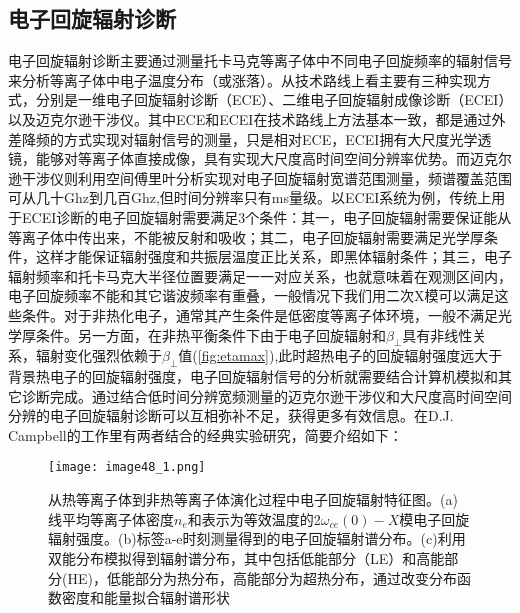 \subsection{	电子回旋辐射诊断}
电子回旋辐射诊断主要通过测量托卡马克等离子体中不同电子回旋频率的辐射信号来分析等离子体中电子温度分布（或涨落）。从技术路线上看主要有三种实现方式，分别是一维电子回旋辐射诊断（ECE）、二维电子回旋辐射成像诊断（ECEI）以及迈克尔逊干涉仪。其中ECE和ECEI在技术路线上方法基本一致，都是通过外差降频的方式实现对辐射信号的测量，只是相对ECE，ECEI拥有大尺度光学透镜，能够对等离子体直接成像，具有实现大尺度高时间空间分辨率优势。而迈克尔逊干涉仪则利用空间傅里叶分析实现对电子回旋辐射宽谱范围测量，频谱覆盖范围可从几十Ghz到几百Ghz,但时间分辨率只有ms量级\cite{RN743}。以ECEI系统为例，传统上用于ECEI诊断的电子回旋辐射需要满足3个条件：其一，电子回旋辐射需要保证能从等离子体中传出来，不能被反射和吸收；其二，电子回旋辐射需要满足光学厚条件，这样才能保证辐射强度和共振层温度正比关系，即黑体辐射条件；其三，电子辐射频率和托卡马克大半径位置要满足一一对应关系，也就意味着在观测区间内，电子回旋频率不能和其它谐波频率有重叠，一般情况下我们用二次X模可以满足这些条件。对于非热化电子，通常其产生条件是低密度等离子体环境，一般不满足光学厚条件。另一方面，在非热平衡条件下由于电子回旋辐射和$β_⊥$具有非线性关系，辐射变化强烈依赖于$β_⊥$值(\autoref{fig:etamax}),此时超热电子的回旋辐射强度远大于背景热电子的回旋辐射强度，电子回旋辐射信号的分析就需要结合计算机模拟和其它诊断完成。通过结合低时间分辨宽频测量的迈克尔逊干涉仪和大尺度高时间空间分辨的电子回旋辐射诊断可以互相弥补不足，获得更多有效信息。在D.J. Campbell\cite{RN726}的工作里有两者结合的经典实验研究，简要介绍如下：
\begin{figure}[ht]
\centering
\texttt{[image: image48\_1.png]}
\caption{\label{fig:ECEspec}从热等离子体到非热等离子体演化过程中电子回旋辐射特征图\cite{RN726}。(a) 线平均等离子体密度$n_e$和表示为等效温度的2$ω_{ce} (0)-X$模电子回旋辐射强度。(b)标签a-e时刻测量得到的电子回旋辐射谱分布。(c)利用双能分布模拟得到辐射谱分布，其中包括低能部分（LE）和高能部分(HE)，低能部分为热分布，高能部分为超热分布，通过改变分布函数密度和能量拟合辐射谱形状}
\end{figure}

